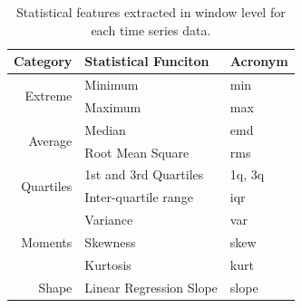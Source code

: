 \begin{table}[h]
\centering
\begin{tabular}{r|l|l}
\hline
Category                   & Statistical Funciton & \multicolumn{1}{l}{Acronym} \\ \hline\hline
\multirow{2}{*}{Extreme}   & Minimum                 & min                          \\ \cline{3-3} 
                           & Maximum                 & max                          \\ \hline
\multirow{2}{*}{Average}   & Median                  & emd                          \\ \cline{3-3} 
                           & Root Mean Square        & rms                          \\ \hline
\multirow{2}{*}{Quartiles} & 1st and 3rd Quartiles   & 1q, 3q                       \\ \cline{3-3} 
                           & Inter-quartile range    & iqr                          \\ \hline
\multirow{3}{*}{Moments}   & Variance                & var                          \\ \cline{3-3} 
                           & Skewness                & skew                         \\ \cline{3-3} 
                           & Kurtosis                & kurt                         \\ \hline
Shape                      & Linear Regression Slope & slope                        \\ \hline
\end{tabular}
\caption{Statistical features extracted in window level for each time series data.}
\label{tabel:fd}
\end{table}


